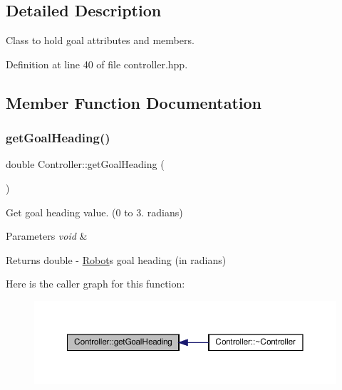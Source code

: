 \subsection{Detailed Description}
Class to hold goal attributes and members. 

Definition at line 40 of file controller.\+hpp.



\subsection{Member Function Documentation}
\mbox{\label{classController_ac0aa43a79fdc74c7bd75bf383c5b80e0}} 
\subsubsection{\texorpdfstring{get\+Goal\+Heading()}{getGoalHeading()}}
{\footnotesize\ttfamily double Controller\+::get\+Goal\+Heading (\begin{DoxyParamCaption}{ }\end{DoxyParamCaption})}



Get goal heading value. (0 to 3. radians) 


\begin{DoxyParams}{Parameters}
{\em void} & \\
\hline
\end{DoxyParams}
\begin{DoxyReturn}{Returns}
double -\/ \hyperlink{classRobot}{Robot}\textquotesingle{}s goal heading (in radians) 
\end{DoxyReturn}
Here is the caller graph for this function\+:
\nopagebreak
\begin{figure}[H]
\begin{center}
\leavevmode
\includegraphics[width=350pt]{classController_ac0aa43a79fdc74c7bd75bf383c5b80e0_icgraph}
\end{center}
\end{figure}
\mbox{\label{classController_ab8161275786c47cc70d1ad82f3c476e2}} 
